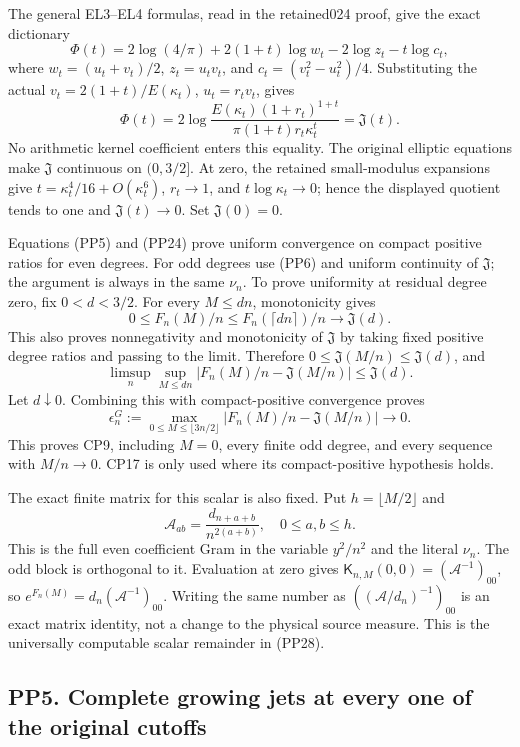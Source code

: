\documentclass[10pt]{article}
\begin{document}
The general EL3--EL4 formulas, read in the retained024 proof, give the exact dictionary \[
\Phi(t)=2\log(4/\pi)+2(1+t)\log w_t-2\log z_t-t\log c_t,
\] where \(w_t=(u_t+v_t)/2\), \(z_t=u_tv_t\), and \(c_t=(v_t^2-u_t^2)/4\). Substituting the actual \(v_t=2(1+t)/E(\kappa_t)\), \(u_t=r_tv_t\), gives \[
\Phi(t)=2\log\frac{E(\kappa_t)(1+r_t)^{1+t}}
{\pi(1+t)r_t\kappa_t^t}=\mathfrak J(t).
\tag{PP26}
\] No arithmetic kernel coefficient enters this equality. The original elliptic equations make \(\mathfrak J\) continuous on \((0,3/2]\). At zero, the retained small-modulus expansions give \(t=\kappa_t^4/16+O(\kappa_t^6)\), \(r_t\to1\), and \(t\log\kappa_t\to0\); hence the displayed quotient tends to one and \(\mathfrak J(t)\to0\). Set \(\mathfrak J(0)=0\).

Equations (PP5) and (PP24) prove uniform convergence on compact positive ratios for even degrees. For odd degrees use (PP6) and uniform continuity of \(\mathfrak J\); the argument is always in the same \(\nu_n\). To prove uniformity at residual degree zero, fix \(0<d<3/2\). For every \(M\le dn\), monotonicity gives \[
0\le F_n(M)/n\le F_n(\lceil dn\rceil)/n
\longrightarrow\mathfrak J(d).
\tag{PP27}
\] This also proves nonnegativity and monotonicity of \(\mathfrak J\) by taking fixed positive degree ratios and passing to the limit. Therefore \(0\le\mathfrak J(M/n)\le\mathfrak J(d)\), and \[
\limsup_n\sup_{M\le dn}|F_n(M)/n-\mathfrak J(M/n)|
\le\mathfrak J(d).
\] Let \(d\downarrow0\). Combining this with compact-positive convergence proves \[
\boxed{\epsilon_n^G:={\max}_{0\le M\le\lfloor3n/2\rfloor}
|F_n(M)/n-\mathfrak J(M/n)|\longrightarrow0.}
\tag{PP28}
\] This proves CP9, including \(M=0\), every finite odd degree, and every sequence with \(M/n\to0\). CP17 is only used where its compact-positive hypothesis holds.

The exact finite matrix for this scalar is also fixed. Put \(h=\lfloor M/2\rfloor\) and \[
\mathcal A_{ab}=\frac{d_{n+a+b}}{n^{2(a+b)}},\quad0\le a,b\le h.
\tag{PP29}
\] This is the full even coefficient Gram in the variable \(y^2/n^2\) and the literal \(\nu_n\). The odd block is orthogonal to it. Evaluation at zero gives \(\mathsf K_{n,M}(0,0)=(\mathcal A^{-1})_{00}\), so \(e^{F_n(M)}=d_n(\mathcal A^{-1})_{00}\). Writing the same number as \(((\mathcal A/d_n)^{-1})_{00}\) is an exact matrix identity, not a change to the physical source measure. This is the universally computable scalar remainder in (PP28).

\subsection{PP5. Complete growing jets at every one of the original cutoffs}\label{pp5.-complete-growing-jets-at-every-one-of-the-original-cutoffs}
\end{document}
